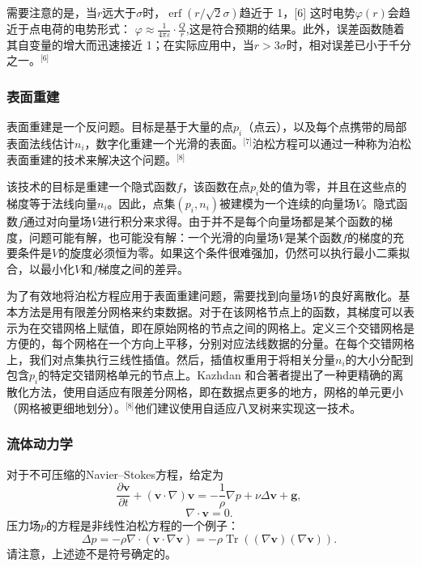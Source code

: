 需要注意的是，当\(r\)远大于\(\sigma\)时，\(\operatorname{erf}(r / \sqrt{2} \sigma)\)趋近于 1，[6] 这时电势\(\varphi(r)\)会趋近于点电荷的电势形式：
\(\varphi \approx \frac{1}{4\pi \varepsilon} \cdot \frac{Q}{r}\),这是符合预期的结果。此外，误差函数随着其自变量的增大而迅速接近 1；在实际应用中，当\(r > 3\sigma\)时，相对误差已小于千分之一。\(^\text{[6]}\)
\subsubsection{表面重建}
表面重建是一个反问题。目标是基于大量的点\(p_i\)（点云），以及每个点携带的局部表面法线估计\(n_i\)，数字化重建一个光滑的表面。\(^\text{[7]}\)泊松方程可以通过一种称为泊松表面重建的技术来解决这个问题。\(^\text{[8]}\)

该技术的目标是重建一个隐式函数\(f\)，该函数在点\(p_i\)处的值为零，并且在这些点的梯度等于法线向量\(n_i\)。因此，点集\((p_i, n_i)\)被建模为一个连续的向量场\(V\)。隐式函数\(f\)通过对向量场\(V\)进行积分来求得。由于并不是每个向量场都是某个函数的梯度，问题可能有解，也可能没有解：一个光滑的向量场\(V\)是某个函数\(f\)的梯度的充要条件是\(V\)的旋度必须恒为零。如果这个条件很难强加，仍然可以执行最小二乘拟合，以最小化\(V\)和\(f\)梯度之间的差异。

为了有效地将泊松方程应用于表面重建问题，需要找到向量场\(V\)的良好离散化。基本方法是用有限差分网格来约束数据。对于在该网格节点上的函数，其梯度可以表示为在交错网格上赋值，即在原始网格的节点之间的网格上。定义三个交错网格是方便的，每个网格在一个方向上平移，分别对应法线数据的分量。在每个交错网格上，我们对点集执行三线性插值。然后，插值权重用于将相关分量\(n_i\)的大小分配到包含\(p_i\)的特定交错网格单元的节点上。Kazhdan 和合著者提出了一种更精确的离散化方法，使用自适应有限差分网格，即在数据点更多的地方，网格的单元更小（网格被更细地划分）。\(^\text{[8]}\)他们建议使用自适应八叉树来实现这一技术。
\subsubsection{流体动力学}
对于不可压缩的Navier–Stokes方程，给定为  
\[
\frac{\partial \mathbf{v}}{\partial t} + (\mathbf{v} \cdot \nabla) \mathbf{v} = -\frac{1}{\rho} \nabla p + \nu \Delta \mathbf{v} + \mathbf{g},~
\]
\[
\nabla \cdot \mathbf{v} = 0.~
\]
压力场\(p\)的方程是非线性泊松方程的一个例子：  
\[
\Delta p = -\rho \nabla \cdot (\mathbf{v} \cdot \nabla \mathbf{v}) = -\rho \operatorname{Tr} \left( (\nabla \mathbf{v})(\nabla \mathbf{v}) \right).~
\]  
请注意，上述迹不是符号确定的。

